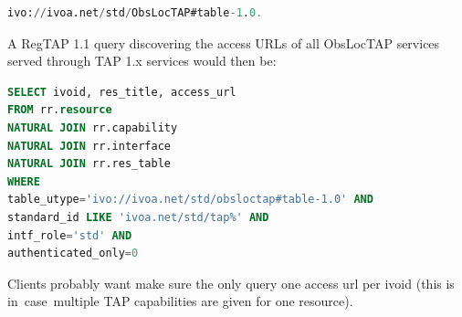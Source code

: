 \documentclass[11pt,a4paper]{ivoa}
\begin{document}
\begin{lstlisting}[language=SQL]
ivo://ivoa.net/std/ObsLocTAP#table-1.0.
\end{lstlisting}

A RegTAP 1.1 query discovering the access URLs of all ObsLocTAP services served
through TAP 1.x services would then be:

\begin{lstlisting}[language=SQL]
SELECT ivoid, res_title, access_url
FROM rr.resource
NATURAL JOIN rr.capability
NATURAL JOIN rr.interface
NATURAL JOIN rr.res_table
WHERE
table_utype='ivo://ivoa.net/std/obsloctap#table-1.0' AND
standard_id LIKE 'ivoa.net/std/tap%' AND
intf_role='std' AND
authenticated_only=0
\end{lstlisting}
Clients probably want make sure the only query one access url per ivoid
(this is in\ case\ multiple TAP capabilities are given for one resource).
\par
\end{document}
